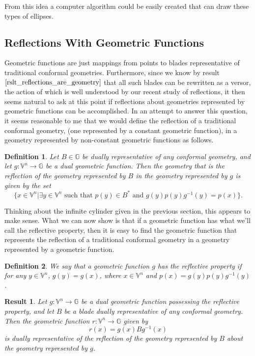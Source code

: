 \documentclass[12pt]{article}
\newcommand{\G}{\mathbb{G}}
\newcommand{\V}{\mathbb{V}}
\newtheorem{definition}{Definition}[section]
\newtheorem{result}{Result}[section]
\begin{document}
From this idea a computer algorithm could be easily created that can
draw these types of ellipses.

\subsection{Reflections With Geometric Functions}

Geometric functions are just mappings from points to blades
representative of traditional conformal geometries.  Furthermore,
since we know by result $\eqref{rslt_reflections_are_geometry}$
that all such blades can be rewritten as a versor, the action of
which is well understood by our recent study of reflections, it then seems natural to ask at this point if reflections about
geometries represented by geometric functions can be accomplished.
In an attempt to answer this question,
it seems reasonable to me that we would define the reflection of a
traditional conformal geometry, (one represented by a constant geometric function),
in a geometry represented by non-constant geometric functions as follows.
\begin{definition}\label{def_geo_func_reflection}
Let $B\in\G$ be dually representative of any conformal geometry,
and let $g:\V^n\to\G$ be a dual geometric function.  Then the geometry
that is the reflection of the geometry represented by $B$ in the
geometry represented by $g$ is given by the set
\begin{equation*}
\{x\in\V^n|\mbox{$\exists y\in\V^n$ such that $p(y)\in B^*$ and $g(y)p(y)g^{-1}(y)=p(x)$}\}.
\end{equation*}
\end{definition}
Thinking about the infinite cylinder given in the previous section, this appears to
make sense.  What we can now show is that if a geometric function has what
we'll call the reflective property, then it is easy to find the geometric function
that represents the reflection of a traditional conformal geometry in a geometry
represented by a geometric function.
\begin{definition}
We say that a geometric function $g$ has the reflective property if for
any $y\in\V^n$, $g(y)=g(x)$, where $x\in\V^n$ and $p(x)=g(y)p(y)g^{-1}(y)$.
\end{definition}
\begin{result}\label{rslt_geo_func_reflect}
Let $g:\V^n\to\G$ be a dual geometric function possessing the reflective property,
and let $B$ be a blade dually representative of any conformal geometry.  Then
the geometric function $r:\V^n\to\G$ given by
\begin{equation*}
r(x) = g(x)Bg^{-1}(x)
\end{equation*}
is dually representative of the reflection of the geometry represented by $B$ about 
the geometry represented by $g$.
\end{result}
\end{document}
